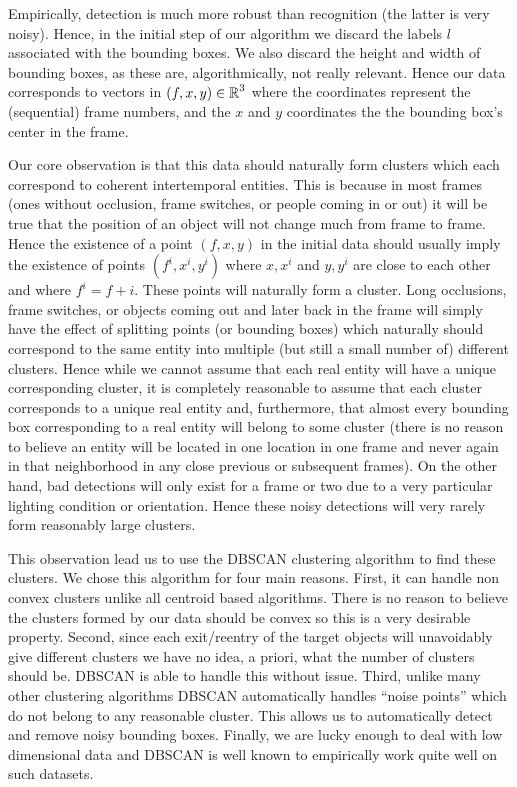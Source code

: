 \documentclass{article}
\begin{document}
Empirically, detection is much more robust than recognition (the latter is very noisy). Hence, in the initial step of our algorithm we discard the labels $l$ associated with the
bounding boxes. We also discard the height and width of bounding boxes, as these are, algorithmically, not really relevant. Hence our data corresponds to vectors in $(f, x, y) \in \operatorname{\mathbb{R}}^3$ where the coordinates
represent the (sequential) frame numbers, and the $x$ and $y$ coordinates the the bounding box's center in the frame.

Our core observation is that this data should naturally form clusters which each correspond to coherent intertemporal entities. This is because in most frames (ones without occlusion, frame switches, or people
coming in or out) it will be true that the position of an object will not change much from frame to frame. Hence the existence of a point $(f, x, y)$ in the initial data should usually imply the existence
of points $(f^i, x^i, y^i)$ where $x, x^i$ and $y, y^i$ are close to each other and where $f^i = f + i$. These points will naturally form a cluster. Long occlusions, frame switches, or objects coming out and
later back in the frame will simply have the effect of splitting points (or bounding boxes) which naturally should correspond to the same entity into multiple (but still a small number of) different clusters.
Hence while we cannot assume that each real entity will have a unique corresponding cluster, it is completely reasonable to assume that each cluster corresponds to a unique real entity and, furthermore, that
almost every bounding box corresponding to a real entity will belong to some cluster (there is no reason to believe an entity will be located in one location in one frame and never again in
that neighborhood in any close previous or subsequent frames). On the other hand, bad detections will only exist for a frame or two due to a very particular lighting condition or orientation. Hence these
noisy detections will very rarely form reasonably large clusters.

This observation lead us to use the DBSCAN \cite{dbscan} clustering algorithm to find these clusters. We chose this algorithm for four main reasons. First, it can handle non convex clusters unlike all centroid
based algorithms. There is no reason to believe the clusters formed by our data should be convex so this is a very desirable property. Second, since each exit/reentry of the target objects will unavoidably
give different clusters we have no idea, a priori, what the number of clusters should be. DBSCAN is able to handle this without issue. Third, unlike many other clustering algorithms
DBSCAN automatically handles ``noise points'' which do not belong to any reasonable cluster. This allows us to automatically detect and remove noisy bounding boxes. Finally, we are lucky enough to deal
with low dimensional data and DBSCAN is well known to empirically work quite well on such datasets.
\end{document}
